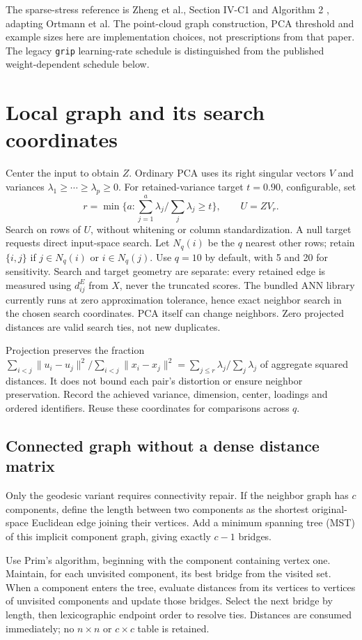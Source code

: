 \documentclass[11pt,letterpaper]{article}
\begin{document}
The sparse-stress reference is Zheng et al., Section IV-C1 and Algorithm 2
\cite{zheng2018sparse}, adapting Ortmann et al. The point-cloud graph construction,
PCA threshold and example sizes here are implementation choices, not prescriptions
from that paper. The legacy \texttt{grip} learning-rate schedule is distinguished
from the published weight-dependent schedule below.

\clearpage\section{Local graph and its search coordinates}
Center the input to obtain $Z$. Ordinary PCA uses its right singular vectors
$V$ and variances $\lambda_1\geq\cdots\geq\lambda_p\geq0$. For retained-variance
target $t=0.90$, configurable, set
\[
r=\min\{a:\sum_{j=1}^a\lambda_j/\sum_j\lambda_j\geq t\},\qquad U=ZV_r.
\]
Search on rows of $U$, without whitening or column standardization. A null target
requests direct input-space search. Let $N_q(i)$ be the $q$ nearest other rows;
retain $\{i,j\}$ if $j\in N_q(i)$ or $i\in N_q(j)$. Use $q=10$ by default,
with 5 and 20 for sensitivity. Search and target geometry are separate: every
retained edge is measured using $d^E_{ij}$ from $X$, never the truncated scores.
The bundled ANN library currently runs at zero approximation tolerance, hence
exact neighbor search in the chosen search coordinates. PCA itself can change
neighbors. Zero projected distances are valid search ties, not new duplicates.

Projection preserves the fraction $\sum_{i<j}\|u_i-u_j\|^2/
\sum_{i<j}\|x_i-x_j\|^2=\sum_{j\leq r}\lambda_j/\sum_j\lambda_j$ of aggregate
squared distances. It does not bound each pair's distortion or ensure neighbor
preservation. Record the achieved variance, dimension, center, loadings and
ordered identifiers. Reuse these coordinates for comparisons across $q$.

\subsection{Connected graph without a dense distance matrix}
Only the geodesic variant requires connectivity repair. If the neighbor graph
has $c$ components, define the length between two components as the shortest
original-space Euclidean edge joining their vertices. Add a minimum spanning
tree (MST) of this implicit component graph, giving exactly $c-1$ bridges.

Use Prim's algorithm, beginning with the component containing vertex one.
Maintain, for each unvisited component, its best bridge from the visited set.
When a component enters the tree, evaluate distances from its vertices to
vertices of unvisited components and update those bridges. Select the next
bridge by length, then lexicographic endpoint order to resolve ties. Distances
are consumed immediately; no $n\times n$ or $c\times c$ table is retained.
\end{document}
